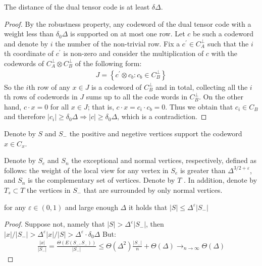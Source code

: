 \begin{claim}
  The distance of the dual tensor code is at least $\delta\Delta$.
\end{claim}
\begin{proof}
By the robustness property, any codeword of the dual tensor code with a weight less than $\delta_{0}\Delta$ is supported on at most one row. Let $c$ be such a codeword and denote by $i$ the number of the non-trivial row. Fix a $c^{\prime} \in C_{A}^{\perp}$ such that the $i$th coordinate of  $c^{\prime}$ is non-zero and consider the multiplication of $c$ with the codewords of $C_{A}^\perp \otimes C_{B}^\perp$ of the following form:
  \begin{equation*}
    \begin{split}
      J = \left\{ c^{\prime} \otimes c_{b} : c_{b}\in C_{B}^{\perp} \right\} 
    \end{split}
  \end{equation*}
  So the $i$th row of any $x \in J$ is a codeword of $C_{B}^{\perp}$ and in total, collecting all the $i$th rows of codewords in $J$ sums up to all the code words in $C_{B}^{\perp}$. On the other hand, $c\cdot x = 0$ for all $x \in J$; that is, $c\cdot x = c_{i} \cdot c_{b} = 0$. Thus we obtain that $c_{i} \in C_{B}$ and therefore $|c_{i}| \ge \delta_{0}\Delta \Rightarrow |c| \ge \delta_{0}\Delta$, which is a contradiction.
\end{proof}

Denote by $S$ and $S_{-}$ the positive and negetive vertices support the codeword $x \in C_{x}$.
\begin{definition}
Denote by $S_e$ and $S_n$ the exceptional and normal vertices, respectively, defined as follows: the weight of the local view for any vertex in $S_e$ is greater than $\Delta^{3/2 + \varepsilon}$, and $S_n$ is the complementary set of vertices. Denote by $T$ . In addition, denote by $T_s \subset T$ the vertices in $S_-$ that are surrounded by only normal vertices.
\end{definition}
\begin{claim}
  \label{claim:epss}
  for any $\varepsilon \in \left( 0,1 \right)$ and large enough $\Delta$  it holds that $ |S| \le \Delta^{\varepsilon}|S_{-}| $ 
\end{claim}
\begin{proof}
  Suppose not, namely that $|S| > \Delta^{\varepsilon}|S_{-}|$, then $|x|/|S_{-}| > \Delta^{\varepsilon}|x|/|S| > \Delta^{\varepsilon} \cdot \delta_{0}\Delta $ But:  
\begin{equation*}
  \begin{split}
    \frac{|x|}{|S_{-}|} = \frac{\Theta \left(E(S_{-},S_{-}) \right)}{|S_{-}|} \le \Theta(\Delta^{2})\frac{|S_{-}|}{n}  + \Theta(\Delta)  \rightarrow_{n\rightarrow \infty} \Theta(\Delta)
  \end{split}
\end{equation*}
\end{proof}

